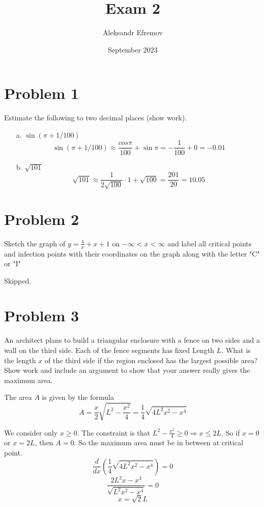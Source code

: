 \documentclass{article}
\title{Exam 2}
\author{Aleksandr Efremov}
\date{September 2023}
\begin{document}
\maketitle

\section{Problem 1}
\begin{tcolorbox}
Estimate the following to two decimal places (show work).
\end{tcolorbox}
\begin{itemize}
    \item[a.] \( \sin{(\pi + 1/100)} \) 
    \[ \sin{(\pi + 1/100)} \approx \frac{cos{\pi}}{100} + \sin{\pi} = -\frac{1}{100} + 0 = -0.01 \]
    \item[b.] \( \sqrt{101} \)
    \[ \sqrt{101} \approx \frac{1}{2\sqrt{100}}  \cdot 1 + \sqrt{100} = \frac{201}{20} = 10.05 \]
\end{itemize}
\section{Problem 2}
\begin{tcolorbox}
    Sketch the graph of \( y = \frac{4}{x} + x + 1 \) on \( -\infty < x < \infty \) and label all critical points and infection points with their coordinates on the graph along with the letter "C" or "I"
\end{tcolorbox}
Skipped.
\section{Problem 3}
\begin{tcolorbox}
     An architect plans to build a triangular enclosure with a fence on two sides and a wall on the third side. Each of the fence segments has fixed Length $L$. What is the length $x$ of the third side if the region enclosed has the largest possible area? Show work and include an argument to show that your answer really gives the maximum area. 
\end{tcolorbox}
\begin{figure}[htp!]
    \centering
    
    \label{fig:fig1}
\end{figure}
The area $A$ is given by the formula
\[ A = \frac{x}{2}\sqrt{L^2 - \frac{x^2}{4}} = \frac{1}{4}\sqrt{4L^2x^2-x^4} \]

We consider only $x \geq 0$. The constraint is that $L^2 - \frac{x^2}{4} \geq 0 \Rightarrow x \leq 2L$. So if $x = 0$ or $x = 2L$, then $A = 0$. So the maximum area must be in between at critical point.
\[ \frac{d}{dx} \left( \frac{1}{4}\sqrt{4L^2x^2-x^4} \right) = 0 \]
\[ \frac{2L^2x - x^3}{\sqrt{L^2x^2-x^4}} = 0 \]
\[ x = \sqrt{2}L \]
\end{document}
